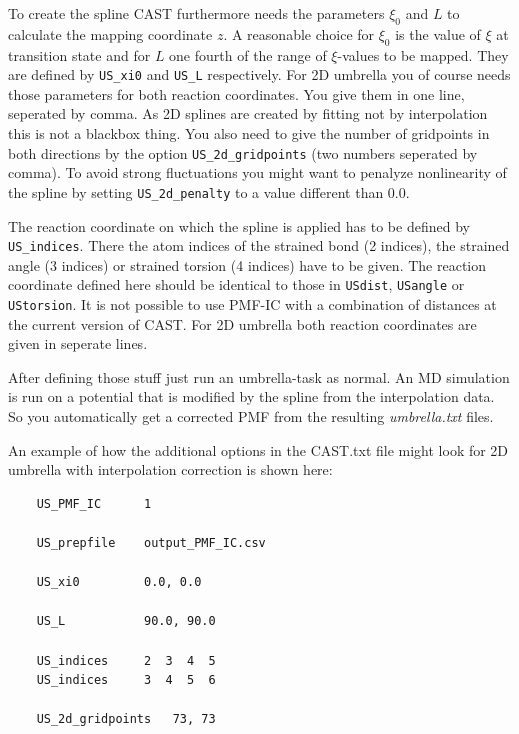 \documentclass[10pt,a4paper]{article} %
\begin{document}
    To create the spline CAST furthermore needs the parameters $\xi_0$ and $L$ to calculate the mapping coordinate $z$. A reasonable choice for $\xi_0$ is the value of $\xi$ at transition state and for $L$ one fourth of the range of $\xi$-values to be mapped. They are defined by \texttt{US\_xi0} and \texttt{US\_L} respectively. For 2D umbrella you of course needs those parameters for both reaction coordinates. You give them in one line, seperated by comma. As 2D splines are created by fitting not by interpolation this is not a blackbox thing.
    You also need to give the number of gridpoints in both directions by the option \texttt{US\_2d\_gridpoints} (two numbers seperated by comma). To avoid strong fluctuations you might want to penalyze nonlinearity of the spline by setting \texttt{US\_2d\_penalty} to a value different than 0.0.
    
    The reaction coordinate on which the spline is applied has to be defined by \texttt{US\_indices}. There the atom indices of the strained bond (2 indices), the strained angle (3 indices) or strained torsion (4 indices) have to be given. The reaction coordinate defined here should be identical to those in \texttt{USdist}, \texttt{USangle} or \texttt{UStorsion}. It is not possible to use PMF-IC with a combination of distances at the current version of CAST. For 2D umbrella both reaction coordinates are given in seperate lines.
    
    After defining those stuff just run an umbrella-task as normal. An MD simulation is run on a potential that is modified by the spline from the interpolation data. So you automatically get a corrected PMF from the resulting \textit{umbrella.txt} files.
    
    An example of how the additional options in the CAST.txt file might look for 2D umbrella with interpolation correction is shown here:
    
    \begin{lstlisting}
    US_PMF_IC      1
    
    US_prepfile    output_PMF_IC.csv
    
    US_xi0         0.0, 0.0
    
    US_L           90.0, 90.0
    
    US_indices     2  3  4  5
    US_indices     3  4  5  6
    
    US_2d_gridpoints   73, 73
    \end{lstlisting}
    ~\\
    
\end{document}

